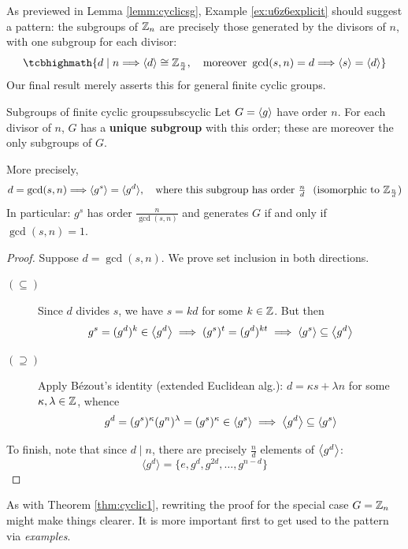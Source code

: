 As previewed in Lemma \ref{lemm:cyclicsg}, Example \ref{ex:u6z6explicit} should suggest a pattern: the subgroups of $\mathbb{Z}_n$ are precisely those generated by the divisors of $n$, with one subgroup for each divisor: 
\[
	\tcbhighmath{d\mid n\Longrightarrow \ip d\cong\Z_{\frac nd},\quad\text{moreover }\gcd(s,n)=d\Longrightarrow \ip s=\ip d}
\]
Our final result merely asserts this for general finite cyclic groups.


\goodbreak


\begin{cor}{Subgroups of finite cyclic groups}{subscyclic}
	Let $G=\left\langle g\right\rangle$ have order $n$. For each divisor of $n$, $G$ has a \textbf{unique subgroup} with this order; these are moreover the only subgroups of $G$.\par
	More precisely, 
	\[
		d=\gcd(s,n)\Longrightarrow \left\langle g^s\right\rangle=\langle{g^d}\rangle, \quad\text{where this subgroup has order $\tfrac nd$ \ (isomorphic to $\mathbb{Z}_{\frac nd}$)}
	\]
	In particular: $g^s$ has order $\frac n{\gcd(s,n)}$ and generates $G$ if and only if $\gcd(s,n)=1$.
\end{cor}


\begin{proof}
	Suppose $d=\gcd(s,n)$. We prove set inclusion in both directions.
	\begin{description}
		\item[$(\subseteq)$] Since $d$ divides $s$, we have $s=kd$ for some $k\in\mathbb{Z}$. But then
		\[
			g^s=(g^d)^{k}\in\bigl\langle g^d\big\rangle \implies (g^s)^t=(g^d)^{kt}\implies  \left\langle g^s\right\rangle\subseteq\bigl\langle g^d\big\rangle
		\]
		\item[$(\supseteq)$] Apply Bézout's identity (extended Euclidean alg.): $d=\kappa s+\lambda n$ for some $\kappa,\lambda\in\mathbb{Z}$, whence
		\[
			g^d=(g^s)^\kappa (g^n)^\lambda=(g^s)^\kappa\in\left\langle g^s\right\rangle \implies \bigl\langle g^d\big\rangle\subseteq\left\langle g^s\right\rangle
		\]
	\end{description}
	To finish, note that since $d\mid n$, there are precisely $\frac nd$ elements of $\left\langle g^d\right\rangle$:
	\[
		\langle{g^d}\rangle=\bigl\{e,g^d,g^{2d},\ldots,g^{n-d}\bigr\}\tag*{\qedhere}
	\]
\end{proof}

As with Theorem \ref{thm:cyclic1}, rewriting the proof for the special case $G=\mathbb{Z}_n$ might make things clearer. It is more important first to get used to the pattern via \emph{examples}.




